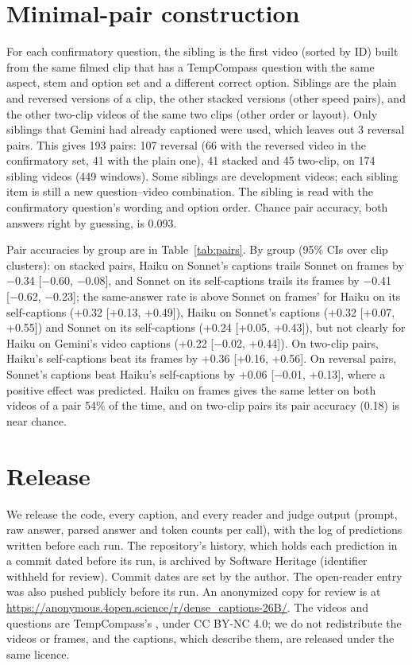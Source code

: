 \documentclass[11pt]{article}
\begin{document}
\section{Minimal-pair construction}
\label{app:pairs}
For each confirmatory question, the sibling is the first video (sorted by ID) built from the same filmed clip that has a TempCompass question with the same aspect, stem and option set and a different correct option. Siblings are the plain and reversed versions of a clip, the other stacked versions (other speed pairs), and the other two-clip videos of the same two clips (other order or layout). Only siblings that Gemini had already captioned were used, which leaves out 3 reversal pairs. This gives 193 pairs: 107 reversal (66 with the reversed video in the confirmatory set, 41 with the plain one), 41 stacked and 45 two-clip, on 174 sibling videos (449 windows). Some siblings are development videos; each sibling item is still a new question--video combination. The sibling is read with the confirmatory question's wording and option order. Chance pair accuracy, both answers right by guessing, is 0.093.

Pair accuracies by group are in Table~\ref{tab:pairs}. By group (95\% CIs over clip clusters): on stacked pairs, Haiku on Sonnet's captions trails Sonnet on frames by −0.34 [−0.60, −0.08], and Sonnet on its self-captions trails its frames by −0.41 [−0.62, −0.23]; the same-answer rate is above Sonnet on frames' for Haiku on its self-captions (+0.32 [+0.13, +0.49]), Haiku on Sonnet's captions (+0.32 [+0.07, +0.55]) and Sonnet on its self-captions (+0.24 [+0.05, +0.43]), but not clearly for Haiku on Gemini's video captions (+0.22 [−0.02, +0.44]). On two-clip pairs, Haiku's self-captions beat its frames by +0.36 [+0.16, +0.56]. On reversal pairs, Sonnet's captions beat Haiku's self-captions by +0.06 [−0.01, +0.13], where a positive effect was predicted. Haiku on frames gives the same letter on both videos of a pair 54\% of the time, and on two-clip pairs its pair accuracy (0.18) is near chance.

\section{Release}
\label{app:release}
We release the code, every caption, and every reader and judge output (prompt, raw answer, parsed answer and token counts per call), with the log of predictions written before each run. The repository's history, which holds each prediction in a commit dated before its run, is archived by Software Heritage (identifier withheld for review). Commit dates are set by the author. The open-reader entry was also pushed publicly before its run. An anonymized copy for review is at \url{https://anonymous.4open.science/r/dense_captions-26B/}. The videos and questions are TempCompass's \citep{tempcompass}, under CC BY-NC 4.0; we do not redistribute the videos or frames, and the captions, which describe them, are released under the same licence.
\end{document}
